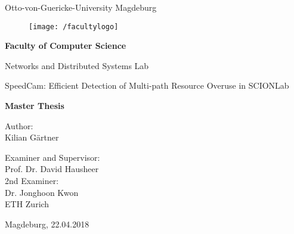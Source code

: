 \documentclass[thesis.tex]{subfiles}
\begin{document}
\thispagestyle {empty}

\begin{center}
\begin{Large}
Otto-von-Guericke-University Magdeburg\\

\begin{figure}
	\centering
	\texttt{[image: /facultylogo]}
	\label{fig:logoinffak}
\end{figure}

\vspace{3mm}

\textbf{Faculty of Computer Science}\\
\end{Large}

\vspace{3mm}

Networks and Distributed Systems Lab\\

\vspace{1cm}
\begin{Huge}
SpeedCam: Efficient Detection of Multi-path Resource Overuse in SCIONLab \\
\end{Huge}
\vspace{15mm}
{\Huge \textbf{Master Thesis}}\\
\vspace{15mm}

Author:\\
\vspace{4mm}
{\huge Kilian G\"{a}rtner}\\

\vspace{16mm}

Examiner and Supervisor:\\
\vspace{2mm}
{\Large Prof. Dr. David Hausheer}\\
\vspace{5mm}
2nd Examiner:\\
\vspace{2mm}
{\Large Dr. Jonghoon Kwon}\\
{ETH Zurich}

\vspace{35mm}

{\large Magdeburg, 22.04.2018}\\

\vspace{40mm}

\end{center}
\clearpage
\end{document}
